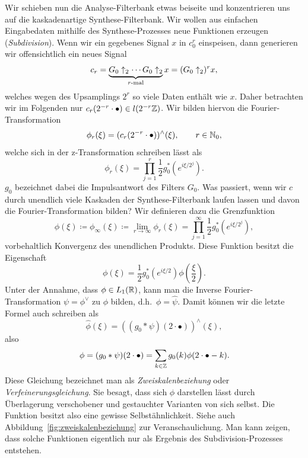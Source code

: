 Wir schieben nun die Analyse-Filterbank etwas beiseite und konzentrieren uns auf die 
kaskadenartige Synthese-Filterbank. Wir wollen aus einfachen Eingabedaten mithilfe des
Synthese-Prozesses neue Funktionen erzeugen (\emph{Subdivision}). Wenn wir ein gegebenes Signal
$ x $ in $ c_{0}^{r} $ einspeisen, dann generieren wir offensichtlich ein neues Signal
\[
    c_{r} 
  = \underbrace{G_{0} \uparrow_{2} \cdots G_{0} \uparrow_{2}}_{\text{$ r $-mal}} x
  = (G_{0} \uparrow_{2})^{r}x,
\]
welches wegen des Upsamplings $ 2^{r} $ so viele Daten enthält wie $ x $. Daher betrachten wir im
Folgenden nur $ c_{r}(2^{-r} \cdot \bullet) \in l(2^{-r}\mathbb{Z}) $. Wir bilden hiervon die 
Fourier-Transformation
\[
  \phi_{r}(\xi) = (c_{r}(2^{-r} \cdot \bullet))^{\wedge}(\xi), \qquad r \in \mathbb{N}_{0},
\]
welche sich in der z-Transformation schreiben lässt als
\[
  \phi_{r}(\xi) = \prod_{j = 1}^{r} \frac{1}{2} g_{0}^{*} \left(e^{i\xi/2^{j}}\right).
\]
$ g_{0} $ bezeichnet dabei die Impulsantwort des Filters $ G_{0} $. Was passiert, wenn wir $ c $ 
durch unendlich viele Kaskaden der Synthese-Filterbank laufen lassen und davon die 
Fourier-Transformation bilden? Wir definieren dazu die Grenzfunktion
\[
  \phi(\xi) \coloneqq \phi_{\infty}(\xi) \coloneqq \lim\limits_{r \to \infty} \phi_{r}(\xi)
  = \prod_{j = 1}^{\infty} \frac{1}{2} g_{0}^{*} \left(e^{i\xi/2^{j}}\right),
\]
vorbehaltlich Konvergenz des unendlichen Produkts. Diese Funktion besitzt die Eigenschaft
\[
  \phi(\xi) = \frac{1}{2} g_{0}^{*} \left( e^{i\xi / 2} \right) \phi \left( \frac{\xi}{2} \right).
\]
Unter der Annahme, dass $ \phi \in L_{1}(\mathbb{R}) $, kann man die Inverse Fourier-Transformation
$ \psi = \phi^{\vee} $ zu $ \phi $ bilden, d.h.\ $ \phi = \widehat{\psi} $. Damit können wir die 
letzte Formel auch schreiben als
\[
  \widehat{\phi}(\xi) = ((g_{0} * \psi)(2 \cdot \bullet))^{\wedge}(\xi),
\]
also
\[
  \phi = (g_{0} * \psi)(2 \cdot \bullet) = \sum_{k \in \mathbb{Z}} g_{0}(k) \phi(2 \cdot \bullet - k).
\]
Diese Gleichung bezeichnet man als \emph{Zweiskalenbeziehung} oder \emph{Verfeinerungsgleichung}.
Sie besagt, dass sich $ \phi $ darstellen lässt durch Überlagerung verschobener und gestauchter
Varianten von sich selbst. Die Funktion besitzt also eine gewisse Selbstähnlichkeit. Siehe auch
Abbildung~\ref{fig:zweiskalenbeziehung} zur Veranschaulichung. Man kann zeigen, dass solche 
Funktionen eigentlich nur als Ergebnis des Subdivision-Prozesses entstehen.
